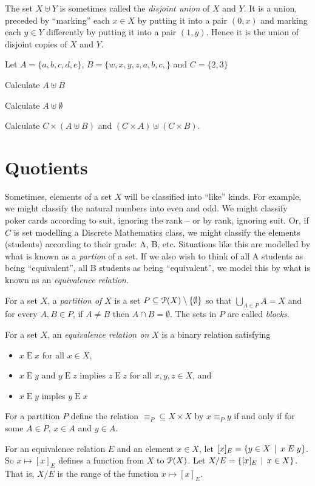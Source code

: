 The set $X\uplus Y$ is sometimes called the \emph{disjoint union} of $X$ and $Y$. It is a union, preceded by ``marking'' each $x\in X$ by putting it into a pair $(0,x)$ and marking each $y\in Y$ differently by putting it into a pair $(1,y)$. Hence it is the union of disjoint copies of $X$ and $Y$.

\begin{exercises}
	Let $A= \{a,b,c,d,e\}$, $B = \{w,x,y,z,a,b,c,\}$ and $C=\{2,3\}$
    	\begin{firstexercise}
		\item Calculate $A\uplus B$
		\item Calculate $A\uplus \emptyset$
		\item Calculate
		$C\times (A\uplus B)$ and $(C\times A )\uplus (C\times B)$.
	\end{firstexercise}
\end{exercises}

\section{Quotients}

Sometimes, elements of a set $X$ will be classified into ``like'' kinds. 
For example, we might classify the natural numbers into even and odd. 
We might classify poker cards according to suit, ignoring the rank -- or by rank, ignoring suit. 
Or, if $C$ is  set modelling a Discrete Mathematics class, we might classify the elements (students) according to their grade: A, B, etc. 
Situations like this are modelled by what is known as a \emph{partion} of a set. If we also wish to think of all A students as being ``equivalent'', all B students as being ``equivalent'', we model this by what is known as an \emph{equivalence relation}.

\begin{defn}
	For a set $X$, a \emph{partition of $X$} is a set $P\subseteq{\mathcal{P}}(X)\setminus\{\emptyset\}$ so that $\bigcup_{A\in P}A = X$ and for every $A,B\in P$, if $A\neq B$ then $A\cap B=\emptyset$. The sets in $P$ are called \emph{blocks}. 
	
	For a set $X$, an \emph{equivalence relation on $X$} is a binary relation satisfying
	\begin{itemize}
		\item $x \mathrel{E}x$ for all $x\in X$,
		\item $x\mathrel{E}y$ and $y\mathrel{E}z$ implies $z\mathrel{E}z$ for all $x,y,z\in X$, and 
		\item $x\mathrel{E}y$ imples $y\mathrel{E}x$
	\end{itemize}
	
	For a partition $P$ define the relation $\mathord{\equiv_P}\subseteq X\times X$ by $x\equiv_P y$ if and only if for some $A\in P$, $x\in A$ and $y\in A$.
	
	For an equivalence relation $E$ and an element $x\in X$, let $[x]_E = \{y\in X\,\mid\, x\mathrel{E} y\}$. So $x\mapsto [x]_E$ defines a function from $X$ to ${\mathcal{P}}(X)$. Let $X/E= \{[x]_E\,\mid\, x\in X\}$.
	That is, $X/E$ is the range of the function $x\mapsto [x]_E$.
\end{defn}

